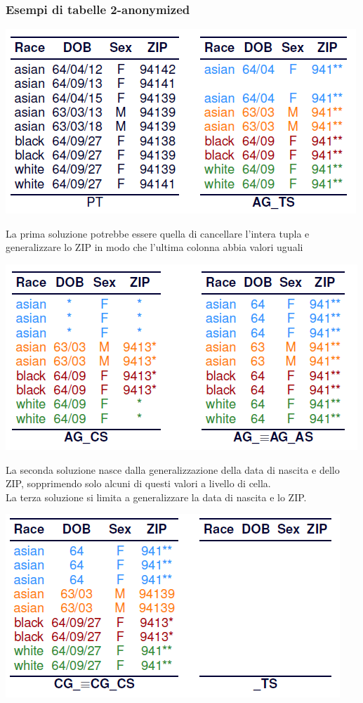 \subsubsection{Esempi di tabelle 2-anonymized}
\begin{center}
    \includegraphics[scale=0.6]{img/2anon1.png}
\end{center}
La prima soluzione potrebbe essere quella di cancellare l'intera tupla e generalizzare lo ZIP in modo che l'ultima colonna abbia valori uguali
\begin{center}
    \includegraphics[scale=0.6]{img/2anon2.png}
\end{center}
La seconda soluzione nasce dalla generalizzazione della data di nascita e dello ZIP, sopprimendo solo alcuni di questi valori a livello di cella.\\
La terza soluzione si limita a generalizzare la data di nascita e lo ZIP.
\begin{center}
    \includegraphics[scale=0.6]{img/2anon3.png}
\end{center}
